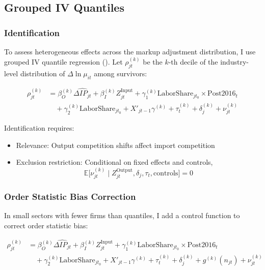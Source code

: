 \documentclass[12pt]{article}
\begin{document}
\subsection{Grouped IV Quantiles}

\subsubsection{Identification}

To assess heterogeneous effects across the markup adjustment distribution, I use grouped IV quantile regression (\cite{chetverikovIVQuantileRegression2016}). Let $\rho_{jt}^{(k)}$ be the $k$-th decile of the industry-level distribution of $\Delta \ln \mu_{it}$ among survivors:

\begin{equation}
\begin{aligned}
\rho_{jt}^{(k)} &= \beta_O^{(k)} \widehat{\Delta IP_{jt}} + \beta_I^{(k)} Z_{jt}^{\text{Input}} + \gamma_1^{(k)} \text{LaborShare}_{jt_0} \times \text{Post2016}_t \\
&\quad + \gamma_2^{(k)} \text{LaborShare}_{jt_0} + X'_{jt-1} \gamma^{(k)} + \tau_t^{(k)} + \delta_j^{(k)} + \nu_{jt}^{(k)}
\end{aligned}
\tag{4}
\end{equation}

Identification requires:
\begin{itemize}
    \item Relevance: Output competition shifts affect import competition
    \item Exclusion restriction: Conditional on fixed effects and controls,
    \[
    \mathbb{E}\Big[\nu_{jt}^{(k)} \mid Z_{jt}^{\text{Output}}, \delta_j, \tau_t, \text{controls}\Big] = 0
    \]
\end{itemize}

\subsubsection{Order Statistic Bias Correction}

In small sectors with fewer firms than quantiles, I add a control function to correct order statistic bias:

\begin{equation}
\begin{aligned}
\rho_{jt}^{(k)} &= \beta_O^{(k)} \widehat{\Delta IP_{jt}} + \beta_I^{(k)} Z_{jt}^{\text{Input}} + \gamma_1^{(k)} \text{LaborShare}_{jt_0} \times \text{Post2016}_t \\
&\quad + \gamma_2^{(k)} \text{LaborShare}_{jt_0} + X'_{jt-1} \gamma^{(k)} + \tau_t^{(k)} + \delta_j^{(k)} + g^{(k)}(n_{jt}) + \nu_{jt}^{(k)}
\end{aligned}
\tag{5}
\end{equation}
\end{document}
